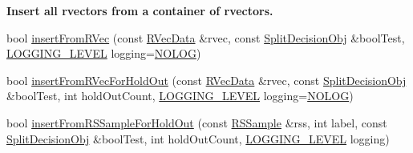 \begin{Indent}{\bf \-Insert all rvectors from a container of rvectors.}\par
\begin{DoxyCompactItemize}
\item 
bool \hyperlink{classsubpavings_1_1AdaptiveHistogramValidation_aa0d5d92e0474bfc0574340b34268dd39}{insert\-From\-R\-Vec} (const \hyperlink{namespacesubpavings_a30e15e24c8d81a2160d7422ef3c39d68}{\-R\-Vec\-Data} \&rvec, const \hyperlink{classsubpavings_1_1SplitDecisionObj}{\-Split\-Decision\-Obj} \&bool\-Test, \hyperlink{namespacesubpavings_aef8e51096b59ecaf1a1e9b2ee24b6089}{\-L\-O\-G\-G\-I\-N\-G\-\_\-\-L\-E\-V\-E\-L} logging=\hyperlink{namespacesubpavings_aef8e51096b59ecaf1a1e9b2ee24b6089a1e5eba048e2496b2450d63fc2e9d1737}{\-N\-O\-L\-O\-G})
\item 
bool \hyperlink{classsubpavings_1_1AdaptiveHistogramValidation_a6817e38bd1c2749a711f702c70dd16b5}{insert\-From\-R\-Vec\-For\-Hold\-Out} (const \hyperlink{namespacesubpavings_a30e15e24c8d81a2160d7422ef3c39d68}{\-R\-Vec\-Data} \&rvec, const \hyperlink{classsubpavings_1_1SplitDecisionObj}{\-Split\-Decision\-Obj} \&bool\-Test, int hold\-Out\-Count, \hyperlink{namespacesubpavings_aef8e51096b59ecaf1a1e9b2ee24b6089}{\-L\-O\-G\-G\-I\-N\-G\-\_\-\-L\-E\-V\-E\-L} logging=\hyperlink{namespacesubpavings_aef8e51096b59ecaf1a1e9b2ee24b6089a1e5eba048e2496b2450d63fc2e9d1737}{\-N\-O\-L\-O\-G})
\item 
bool \hyperlink{classsubpavings_1_1AdaptiveHistogramValidation_ace1a6eca888d6251a7e3db5d1c59bf2b}{insert\-From\-R\-S\-Sample\-For\-Hold\-Out} (const \hyperlink{classRSSample}{\-R\-S\-Sample} \&rss, int label, const \hyperlink{classsubpavings_1_1SplitDecisionObj}{\-Split\-Decision\-Obj} \&bool\-Test, int hold\-Out\-Count, \hyperlink{namespacesubpavings_aef8e51096b59ecaf1a1e9b2ee24b6089}{\-L\-O\-G\-G\-I\-N\-G\-\_\-\-L\-E\-V\-E\-L} logging)
\end{DoxyCompactItemize}
\end{Indent}
